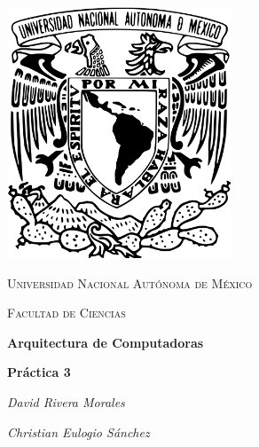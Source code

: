 \begin{titlepage}
    \centering
    \includegraphics[width=0.50\textwidth]{unam_logo.png}\par
    \vspace{1cm}
    {\scshape\Large Universidad Nacional Autónoma de México \par}
    \vspace{1cm}
    {\scshape\Large Facultad de Ciencias \par}
    \vspace{1.5cm}
    {\huge\bfseries Arquitectura de Computadoras \par}
    {\huge\bfseries Práctica 3 \par}
    \vspace{2cm}
    {\Large\itshape David Rivera Morales\par}
    {\Large \itshape Christian Eulogio Sánchez \par}
    \vfill
  
\end{titlepage}

